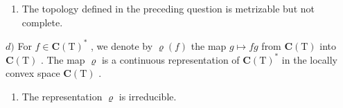 \begin{enumerate}
\def\labelenumi{\alph{enumi})}
\setcounter{enumi}{2}
\tightlist
\item
  The topology defined in the preceding question is metrizable but not complete.
\end{enumerate}

\(d)\) For \(f \in \mathbf{C}(\mathrm{T})^*\) , we denote by \(\varrho(f)\) the map \(g \mapsto fg\) from \(\mathbf{C}(\mathrm{T})\) into \(\mathbf{C}(\mathrm{T})\) . The map \(\varrho\) is a continuous representation of \(\mathbf{C}(\mathrm{T})^*\) in the locally convex space \(\mathbf{C}(\mathrm{T})\) .

\begin{enumerate}
\def\labelenumi{\alph{enumi})}
\setcounter{enumi}{4}
\tightlist
\item
  The representation \(\varrho\) is irreducible.
\end{enumerate}

